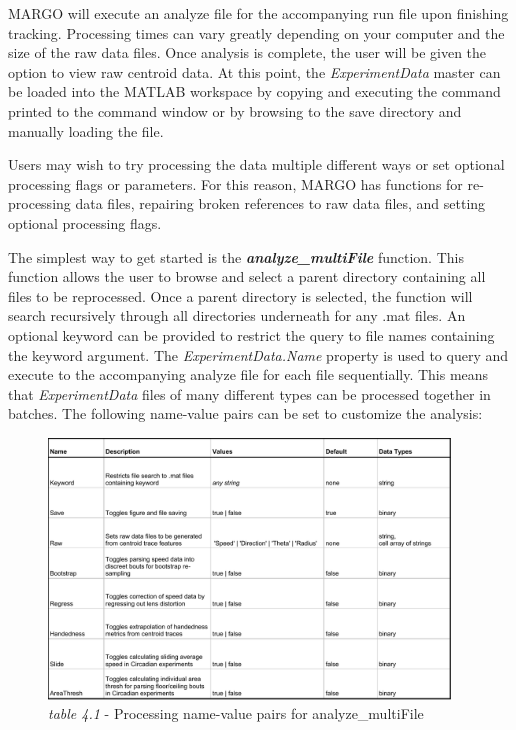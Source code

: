 \documentclass[11pt]{article}
\begin{document}
MARGO will execute an analyze file for the  accompanying run file upon finishing tracking. Processing times can vary greatly depending on your computer and the size of the raw data files. Once analysis is complete, the user will be given the option to view raw centroid data. At this point, the \emph{\textit{ExperimentData}} master can be loaded into the MATLAB workspace by copying and executing the command printed to the command window or by browsing to the save directory and manually loading the file.

Users may wish to try processing the data multiple different ways or set optional  processing flags or parameters. For this reason, MARGO has functions for re-processing data files, repairing broken references to raw data files, and setting optional processing flags.

The simplest way to get started is the \textbf{\textit{analyze\_multiFile}} function. This function allows the user to browse and select a parent directory containing all files to be reprocessed. Once a parent directory is selected, the function will search recursively through all directories underneath for any .mat files. An optional keyword can be provided to restrict the query to file names containing the keyword argument. The \textit{\textit{ExperimentData}.Name} property is used to query and execute to the accompanying analyze file for each file sequentially. This means that \textit{\textit{ExperimentData}} files of many different types can be processed together in batches. The following name-value pairs can be set to customize the analysis:

\begin{figure}[h!]
	\vspace*{0.75cm}
	\begin{center}
		\includegraphics[width=0.95\textwidth]{images/analysis/namevalue.pdf}
		\caption*{\footnotesize {\textit{table 4.1} - Processing name-value pairs for analyze\_multiFile}}
	\end{center}
\end{figure}
\end{document}
